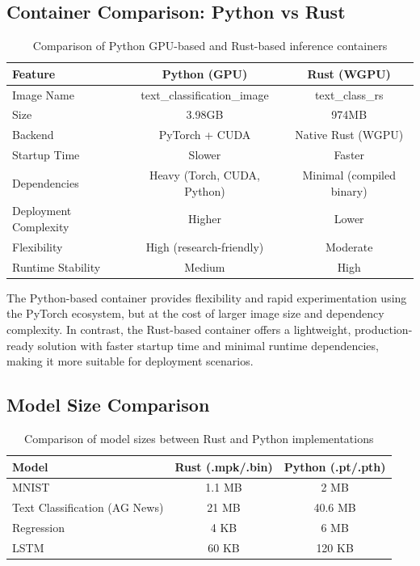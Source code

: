 \documentclass{ieeeaccess}
\begin{document}
\newpage

\subsection{Container Comparison: Python vs Rust}

\begin{table}[t!]
\centering
\begin{tabular}{|l|c|c|}
\hline
\textbf{Feature} & \textbf{Python (GPU)} & \textbf{Rust (WGPU)} \\
\hline
Image Name & text\_classification\_image & text\_class\_rs \\
\hline
Size &  3.98GB &  974MB \\
\hline
Backend & PyTorch + CUDA & Native Rust (WGPU) \\
\hline
Startup Time & Slower & Faster \\
\hline
Dependencies & Heavy (Torch, CUDA, Python) & Minimal (compiled binary) \\
\hline
Deployment Complexity & Higher & Lower \\
\hline
Flexibility & High (research-friendly) & Moderate \\
\hline
Runtime Stability & Medium & High \\
\hline
\end{tabular}
\caption{Comparison of Python GPU-based and Rust-based inference containers}
\end{table}

\noindent
The Python-based container provides flexibility and rapid experimentation using the PyTorch ecosystem, but at the cost of larger image size and dependency complexity. In contrast, the Rust-based container offers a lightweight, production-ready solution with faster startup time and minimal runtime dependencies, making it more suitable for deployment scenarios.


\subsection{Model Size Comparison}
 
\begin{table}[t!]
\centering
\begin{tabular}{|l|c|c|}
\hline
\textbf{Model} & \textbf{Rust (.mpk/.bin)} & \textbf{Python (.pt/.pth)} \\
\hline
MNIST & 1.1 MB & 2 MB \\
\hline
Text Classification (AG News) & 21 MB & 40.6 MB \\
\hline
Regression & 4 KB & 6 MB \\
\hline
LSTM & 60 KB & 120 KB \\
\hline
\end{tabular}
\caption{Comparison of model sizes between Rust and Python implementations}
\end{table}
\end{document}
